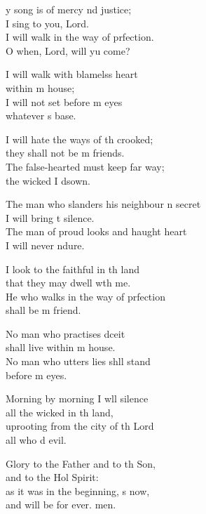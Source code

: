 \settowidth{\versewidth}{The man who slanders his neighbor in secret *}
\begin{psalmverse}%
  \begin{patverse}
y song is of mercy nd justice;\Med\\
I sing to you,  Lord.\\
I will walk in the way of prfection.\Med\\
O when, Lord, will yu come?

I will walk with blamelss heart\Med\\
within m house;\\
I will not set before m eyes\Med\\
whatever \pointup{\i}s base.

I will hate the ways of th crooked;\Med\\
they shall not be m friends.\\
The false-hearted must keep far way;\Med\\
the wicked I d\pointup{\i}sown.

The man who slanders his neighbour \pointup{\i}n secret\Med\\
I will bring t silence.\\
The man of proud looks and haught heart\Med\\
I will never ndure.

I look to the faithful in th land\Med\\
that they may dwell w\pointup{\i}th me.\\
He who walks in the way of prfection\Med\\
shall be m friend.

No man who practises dceit\Med\\
shall live within m house.\\
No man who utters lies shll stand\Med\\
before m eyes.

Morning by morning I w\pointup{\i}ll silence\Med\\
all the wicked in th land,\\
uprooting from the city of th Lord\Med\\
all who d evil.

Glory to the Father and to th Son,\Med\\
and to the Hol Spirit:\\
as it was in the beginning, \pointup{\i}s now,\Med\\
and will be for ever. men.
  \end{patverse}
\end{psalmverse}
\setlength{\leftmargini}{\defleftmargini}  %

